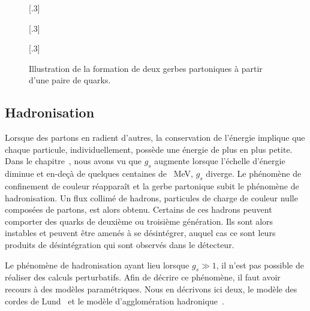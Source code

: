 \begin{figure}[h]
\centering
{}[.3\textwidth]
{\begin{tikzpicture}

\end{tikzpicture}}
\hfill
{}[.3\textwidth]
{\begin{tikzpicture}


\end{tikzpicture}}
\hfill
{}[.3\textwidth]
{\begin{tikzpicture}



\end{tikzpicture}}

\caption[Formation de deux gerbes partoniques.]{Illustration de la formation de deux gerbes partoniques à partir d'une paire de quarks.}
\label{fig-parton_shower}
\end{figure}

\subsection{Hadronisation}\label{chapter-JERC-section-jets-subsec-hadronisation}
Lorsque des partons en radient d'autres, la conservation de l'énergie implique que chaque particule, individuellement, possède une énergie de plus en plus petite.
Dans le chapitre~, nous avons vu que $g_s$ augmente lorsque l'échelle d'énergie diminue et en-deçà de quelques centaines de \SI{}{\MeV}, $g_s$ diverge.
Le phénomène de confinement de couleur réapparaît et la gerbe partonique subit le phénomène de hadronisation.
Un flux collimé de hadrons, particules de charge de couleur nulle composées de partons, est alors obtenu.
Certains de ces hadrons peuvent comporter des quarks de deuxième ou troisième génération. Ils sont alors instables et peuvent être amenés à se désintégrer, auquel cas ce sont leurs produits de désintégration qui sont observés dans le détecteur.
\par Le phénomène de hadronisation ayant lieu lorsque $g_s\gg1$, il n'est pas possible de réaliser des calculs perturbatifs. Afin de décrire ce phénomène, il faut avoir recours à des modèles paramétriques. Nous en décrivons ici deux, le modèle des cordes de Lund~\cite{Andersson_parton_fragmentation} et le modèle d'agglomération hadronique~\cite{Winter_2004}.

